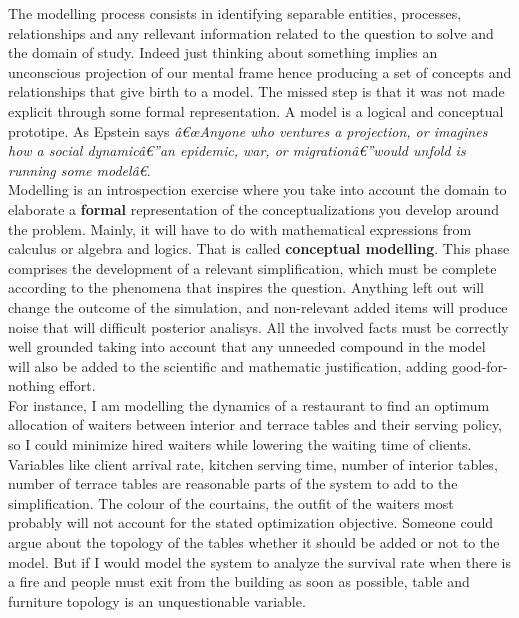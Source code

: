 \documentclass{report}
\begin{document}
The modelling process consists in identifying separable entities, processes, relationships and any rellevant information related to the question to solve and the domain of study. Indeed just thinking about something implies an unconscious projection of our mental frame hence producing a set of concepts and relationships that give birth to a model. The missed step is that it was not made explicit through some formal representation. A model is a logical and conceptual prototipe.
As Epstein \cite{Epstein2008} says \textit{â€œAnyone who ventures a projection, or imagines how a social dynamicâ€”an epidemic, war, or migrationâ€”would unfold is running some modelâ€}.\\

Modelling is an introspection exercise where you take into account the domain to elaborate a \textbf{formal} representation of the conceptualizations you develop around the problem. Mainly, it will have to do with mathematical expressions from calculus or algebra and logics. That is called \textbf{conceptual modelling}. This phase comprises the development of a relevant simplification, which must be complete according to the phenomena that inspires the question. Anything left out will change the outcome of the simulation, and non-relevant added items will produce noise that will difficult posterior analisys. All the involved facts must be correctly well grounded taking into account that any unneeded compound in the model will also be added to the scientific and mathematic justification, adding good-for-nothing effort. \\

For instance, I am modelling the dynamics of a restaurant to find an optimum allocation of waiters between interior and terrace tables and their serving policy, so I could minimize hired waiters while lowering the waiting time of clients. Variables like client arrival rate, kitchen serving time, number of interior tables, number of terrace tables are reasonable parts of the system to add to the simplification. The colour of the courtains, the outfit of the waiters most probably will not account for the stated optimization objective. Someone could argue about the topology of the tables whether it should be added or not to the model. But if I would model the system to analyze the survival rate when there is a fire and people must exit from the building as soon as possible, table and furniture topology is an unquestionable variable.\\
\end{document}
